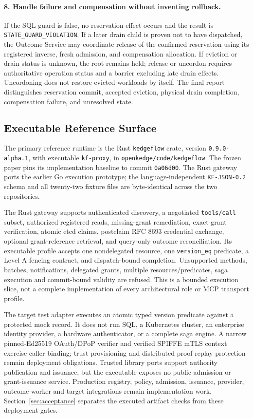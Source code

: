 \paragraph{8. Handle failure and compensation without inventing rollback.}
If the SQL guard is false, no reservation effect occurs and the result is \texttt{STATE\_GUARD\_VIOLATION}. If a later drain child is proven not to have dispatched, the Outcome Service may coordinate release of the confirmed reservation using its registered inverse, fresh admission, and compensation allocation. If eviction or drain status is unknown, the root remains held; release or uncordon requires authoritative operation status and a barrier excluding late drain effects. Uncordoning does not restore evicted workloads by itself. The final report distinguishes reservation commit, accepted eviction, physical drain completion, compensation failure, and unresolved state.

\subsection{Executable Reference Surface}
\label{sec:prototype}
The primary reference runtime is the Rust \texttt{kedgeflow} crate, version \texttt{0.9.0-alpha.1}, with executable \texttt{kf-proxy}, in \texttt{openkedge/code/kedgeflow}. The frozen paper pins its implementation baseline to commit \texttt{0a06d00}. The Rust gateway ports the earlier Go execution prototype; the language-independent \texttt{KF-JSON-0.2} schema and all twenty-two fixture files are byte-identical across the two repositories.

The Rust gateway supports authenticated discovery, a negotiated \texttt{tools/call} subset, authorized registered reads, missing-grant remediation, exact grant verification, atomic etcd claims, postclaim RFC 8693 credential exchange, optional grant-reference retrieval, and query-only outcome reconciliation. Its executable profile accepts one nondelegated resource, one \texttt{version\_eq} predicate, a Level A fencing contract, and dispatch-bound completion. Unsupported methods, batches, notifications, delegated grants, multiple resources/predicates, saga execution and commit-bound validity are refused. This is a bounded execution slice, not a complete implementation of every architectural role or MCP transport profile.

The target test adapter executes an atomic typed version predicate against a protected mock record. It does not run SQL, a Kubernetes cluster, an enterprise identity provider, a hardware authenticator, or a complete saga engine. A narrow pinned-Ed25519 OAuth/DPoP verifier and verified SPIFFE mTLS context exercise caller binding; trust provisioning and distributed proof replay protection remain deployment obligations. Trusted library ports support authority publication and issuance, but the executable exposes no public admission or grant-issuance service. Production registry, policy, admission, issuance, provider, outcome-worker and target integrations remain implementation work. Section~\ref{sec:acceptance} separates the executed artifact checks from these deployment gates.

